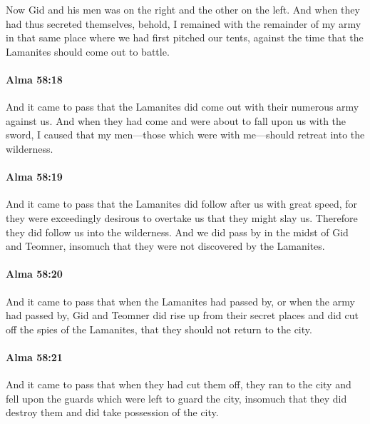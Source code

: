 			Now Gid and his men was on the right and the other on the left.
			And when they had thus secreted themselves,
			behold, I remained with the remainder of my army in that same place
			where we had first pitched our tents,
			against the time that the Lamanites should come out to battle.

		\paragraph{Alma 58:18} %
			\label{ALMA-58-18}

			And it came to pass that
			the Lamanites did come out with their numerous army against us.
			And when they had come and were about to fall upon us with the sword,
			I caused that my men---those which were with me---should retreat into the wilderness.

		\paragraph{Alma 58:19} %
			\label{ALMA-58-19}

			And it came to pass that the Lamanites did follow after us with great speed,
			for they were exceedingly desirous to overtake us that they might slay us.
			Therefore they did follow us into the wilderness.
			And we did pass by in the midst of Gid and Teomner,
			insomuch that they were not discovered by the Lamanites.

		\paragraph{Alma 58:20} %
			\label{ALMA-58-20}

			And it came to pass that when the Lamanites had passed by,
			or when the army had passed by,
			Gid and Teomner did rise up from their secret places
			and did cut off the spies of the Lamanites,
			that they should not return to the city.

		\paragraph{Alma 58:21} %
			\label{ALMA-58-21}

			And it came to pass that when they had cut them off,
			they ran to the city and fell upon the guards which were left to guard the city,
			insomuch that they did destroy them and did take possession of the city.

